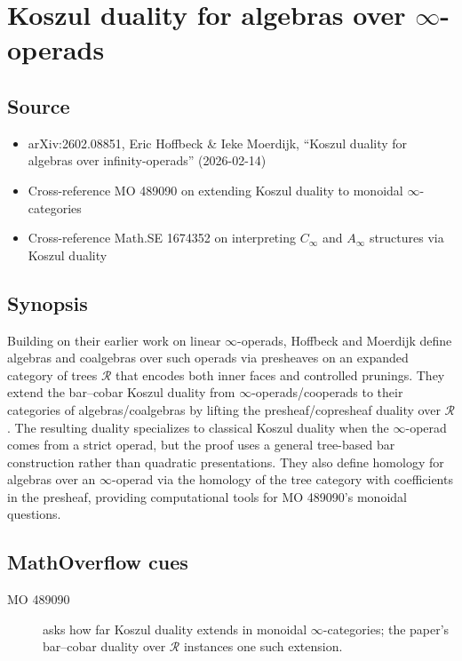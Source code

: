 \section*{Koszul duality for algebras over $\infty$-operads}
\subsection*{Source}
\begin{itemize}
  \item arXiv:2602.08851, Eric Hoffbeck \& Ieke Moerdijk, ``Koszul duality for algebras over infinity-operads'' (2026-02-14)
  \item Cross-reference MO 489090 on extending Koszul duality to monoidal $\infty$-categories
  \item Cross-reference Math.SE 1674352 on interpreting $C_\infty$ and $A_\infty$ structures via Koszul duality
\end{itemize}
\subsection*{Synopsis}
Building on their earlier work on linear $\infty$-operads, Hoffbeck and Moerdijk define algebras and coalgebras over such operads via presheaves on an expanded category of trees $\mathcal{R}$ that encodes both inner faces and controlled prunings. They extend the bar--cobar Koszul duality from $\infty$-operads/cooperads to their categories of algebras/coalgebras by lifting the presheaf/copresheaf duality over $\mathcal{R}$. The resulting duality specializes to classical Koszul duality when the $\infty$-operad comes from a strict operad, but the proof uses a general tree-based bar construction rather than quadratic presentations. They also define homology for algebras over an $\infty$-operad via the homology of the tree category with coefficients in the presheaf, providing computational tools for MO 489090’s monoidal questions.
\subsection*{MathOverflow cues}
\begin{description}
  \item[MO 489090] asks how far Koszul duality extends in monoidal $\infty$-categories; the paper’s bar--cobar duality over $\mathcal{R}$ instances one such extension.
\end{description}
